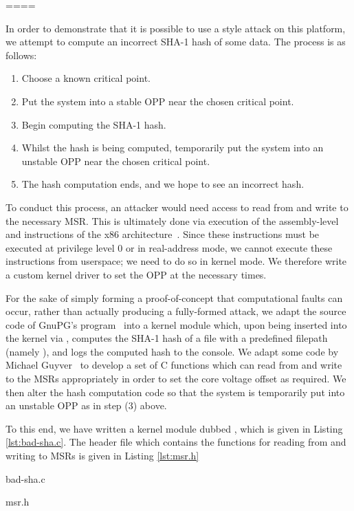 ====

In order to demonstrate that it is possible to use a \clkscrew{} style attack
on this platform, we attempt to compute an incorrect SHA-1 hash of some data.
The process is as follows:

\begin{enumerate}
    \item Choose a known critical point.
    \item Put the system into a stable OPP near the chosen critical point.
    \item Begin computing the SHA-1 hash.
    \item Whilst the hash is being computed, temporarily put the system into an
        unstable OPP near the chosen critical point.
    \item The hash computation ends, and we hope to see an incorrect hash.
\end{enumerate}

To conduct this process, an attacker would need access to read from and write to
the necessary MSR. This is ultimately done via execution of the assembly-level
 and  instructions of the x86
architecture~\cite[Vol. 2, §§4.3–4]{intelDevManual}. Since these instructions
must be executed at privilege level 0 or in real-address mode, we cannot
execute these instructions from userspace; we need to do so in kernel mode. We
therefore write a custom kernel driver to set the OPP at the necessary times.

For the sake of simply forming a proof-of-concept that computational faults can
occur, rather than actually producing a fully-formed attack, we adapt the source
code of GnuPG's  program~\cite{gnupgSHA} into a kernel module
which, upon being inserted into the kernel via , computes the
SHA-1 hash of a file with a predefined filepath (namely
), and logs the computed hash to the console. We
adapt some code by Michael Guyver~\cite{guyverCode} to develop a set of C
functions which can read from and write to the MSRs appropriately in order to
set the core voltage offset as required. We then alter the hash computation code
so that the system is temporarily put into an unstable OPP as in step (3) above.

To this end, we have written a kernel module dubbed , which is
given in Listing \ref{lst:bad-sha.c}. The header file  which
contains the functions for reading from and writing to MSRs is given in
Listing \ref{lst:msr.h}


    {bad-sha.c}


    {msr.h}
